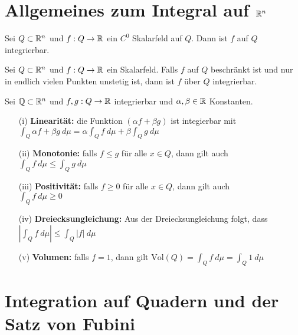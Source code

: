 \section{Allgemeines zum Integral auf $\mathbb{R}^n$}

\begin{theorem}
    Sei $Q \subset \mathbb{R}^n$ und $f: Q\to \mathbb{R}$ ein $C^0$ Skalarfeld auf $Q$. Dann ist $f$ auf $Q$ integrierbar.
\end{theorem}

\begin{theorem}
    Sei $Q \subset \mathbb{R}^n$ und $f: Q \to \mathbb{R}$ ein Skalarfeld. Falls $f$ auf $Q$ beschränkt ist und nur in endlich vielen Punkten unstetig ist, dann ist $f$ über $Q$ integrierbar.
\end{theorem}

\begin{theorem}[Integraleigenschaften]
    Sei $\mathbb{Q} \subset \mathbb{R}^n$ und $f,g: Q \to \mathbb{R}$ integrierbar und $\alpha,\beta \in \mathbb{R}$ Konstanten.
    \begin{itemize}
        \item[(i)] \textbf{Linearität:} die Funktion $(\alpha f + \beta g)$ ist integierbar mit \\
        $ \int_Q  \alpha f + \beta g \: d \mu = \alpha \int_Q f \: d \mu + \beta \int_Q g \: d \mu$
        \item[(ii)] \textbf{Monotonie:} falls $f \leq g$ für alle $x \in Q$, dann gilt auch \\
        $ \int_Q f \: d \mu \leq \int_Q g \: d \mu$
        \item[(iii)] \textbf{Positivität:} falls $f \geq 0$ für alle $x \in Q$, dann gilt auch\\
        $ \int_Q f \: d \mu \geq 0$
        \item[(iv)] \textbf{Dreiecksungleichung:} Aus der Dreiecksungleichung folgt, dass \\
        $ \left| \int_Q f \: d\mu \right| \leq \int_Q |f| \: d\mu$
        \item[(v)] \textbf{Volumen:} falls $f = 1$, dann gilt
        $ \mathrm{Vol}(Q) = \int_Q f \: d \mu = \int_Q 1 \: d\mu$
    \end{itemize}
\end{theorem}

\section{Integration auf Quadern und der Satz von Fubini}

